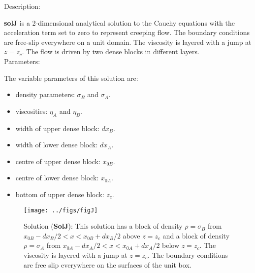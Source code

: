   {\large \fontB Description:}
  
  {\bf solJ} is a 2-dimensional analytical solution to the Cauchy equations with the acceleration term set to zero
  to represent creeping flow. The boundary conditions are free-slip everywhere on a unit domain. 
  The viscosity is layered with a jump at $ z=z_c $.
  The flow is driven by two dense blocks in different layers.
  \\

  {\large \fontB Parameters:}
 
  The variable parameters of this solution are:
  \begin{itemize}
    \item{density parameters: $ \sigma_B $ and $ \sigma_A $.}
    \item{viscosities: $\eta_A$ and $\eta_B$.}
    \item{width of upper dense block: $dx_B$.}
    \item{width of lower dense block: $dx_A$.}
    \item{centre of upper dense block: $x_{0B}$.}
    \item{centre of lower dense block: $x_{0A}$.}
    \item{bottom of upper dense block: $z_c$.}
    \end{itemize}

  \begin{SCfigure}[][h]
    \texttt{[image: ../figs/figJ]}
    \caption[Short caption]{\label{figJ} 
      Solution ({\bf SolJ}):
      This solution has a block of density $\rho = \sigma_B$ from $x_{0B}-dx_B/2 < x < x_{0B}+dx_B/2$ above
      $ z= z_c$ and a block of density $\rho = \sigma_A$ from $x_{0A}-dx_A/2 < x < x_{0A}+dx_A/2$ below
      $ z= z_c$.
      The viscosity is layered with a jump at $ z=z_c $.
      The boundary conditions are free slip everywhere on the surfaces of the unit box.}
  \end{SCfigure} 
  

